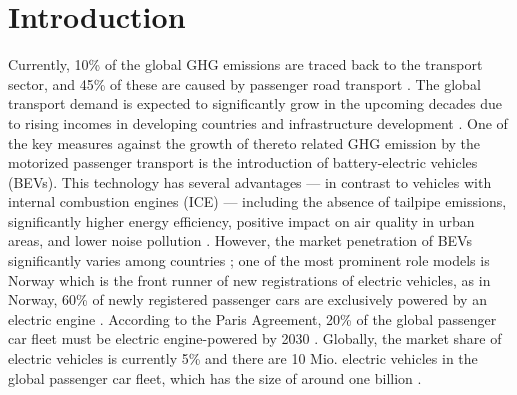 \documentclass[journal,article,submit,pdftex,moreauthors]{Definitions/mdpi}
\begin{document}




\section{Introduction}

Currently, 10\% of the global GHG emissions are traced back to the transport sector, and 45\% of these are caused by passenger road transport \citep{cazzola2016global}. The global transport demand is expected to significantly grow in the upcoming decades due to rising incomes in developing countries and infrastructure development \citep{Moriarty2008}. One of the key measures against the growth of thereto related GHG emission by the motorized passenger transport is the introduction of battery-electric vehicles (BEVs). This technology has several advantages --- in contrast to vehicles with internal combustion engines (ICE) --- including the absence of tailpipe emissions, significantly higher energy efficiency, positive impact on air quality in urban areas, and lower noise pollution \cite{wevj8040996}. However, the market penetration of BEVs significantly varies among countries \cite{Parliament2018}; one of the most prominent role models is Norway which is the front runner of new registrations of electric vehicles, as in Norway, 60\% of newly registered passenger cars are exclusively powered by an electric engine \citep{stat}. According to the Paris Agreement, 20\% of the global passenger car fleet must be electric engine-powered by 2030 \cite{paris}. Globally, the market share of electric vehicles is currently 5\% and there are 10 Mio. electric vehicles in the global passenger car fleet, which has the size of around one billion \cite{cazzola2016global}.   
\end{document}
